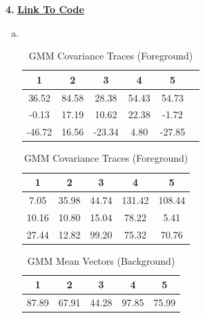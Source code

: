 \documentclass{article}
\begin{document}
\newpage
\textbf{4.} \href{https://colab.research.google.com/drive/18bs5-Mdrc9UFk1NuaMLjxyQVVzHRkCCu?usp=sharing}{\textbf{Link To Code}} \begin{enumerate}[(a)]
    \item \textcolor{white}{{x}}
    \begin{table}[H]
        \centering
        \captionsetup{width=0.8\linewidth} %
        \begin{minipage}[b]{0.45\linewidth}
            \centering
            \caption{GMM Mean Vectors (Foreground)}
            \begin{tabular}{@{}cccccc@{}}
                \toprule
                 1 & 2 & 3 & 4 & 5\\ \midrule
                 36.52 & 84.58 & 28.38 & 54.43 & 54.73\\
                 -0.13 & 17.19 & 10.62 & 22.38 & -1.72\\
                 -46.72 & 16.56 & -23.34 & 4.80 & -27.85\\ \bottomrule
            \end{tabular}
        \end{minipage}
        \hfill
        \begin{minipage}[b]{0.45\linewidth}
            \centering
            \caption{GMM Covariance Traces (Foreground)}
            \begin{tabular}{@{}ccccc@{}}
                \toprule
                1 & 2 & 3 & 4 & 5\\ \midrule
                7.05 & 35.98 & 44.74 & 131.42 & 108.44\\
                10.16 & 10.80 & 15.04 & 78.22 & 5.41 \\
                27.44 & 12.82 & 99.20 & 75.32 & 70.76\\ \bottomrule
            \end{tabular}
        \end{minipage}
    \end{table}
    \begin{table}[H]
        \centering
        \captionsetup{width=0.8\linewidth} %
        \begin{minipage}[b]{0.45\linewidth}
            \centering
            \caption{GMM Mean Vectors (Background)}
            \begin{tabular}{@{}ccccc@{}}
                \toprule
                1 & 2 & 3 & 4 & 5 \\ \midrule
                87.89 & 67.91 & 44.28 & 97.85 & 75.99\\

\end{tabular}
\end{minipage}
\end{table}
\end{enumerate}
\end{document}
